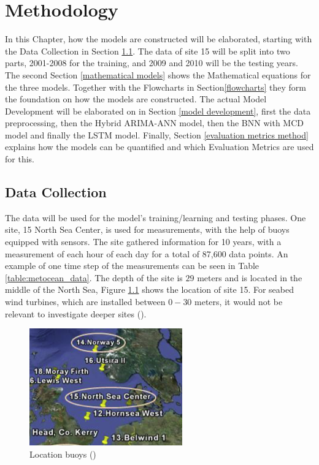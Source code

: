 \chapter{Methodology}
In this Chapter, how the models are constructed will be elaborated, starting with the Data Collection in Section \ref{data_collection}. The data of site 15 will be split into two parts, 2001-2008 for the training, and 2009 and 2010 will be the testing years. The second Section \ref{mathematical models} shows the Mathematical equations for the three models. Together with the Flowcharts in Section\ref{flowcharts} they form the foundation on how the models are constructed. The actual Model Development will be elaborated on in Section \ref{model development}, first the data preprocessing, then the Hybrid ARIMA-ANN model, then the BNN with MCD model and finally the LSTM model. Finally, Section \ref{evaluation metrics method} explains how the models can be quantified and which Evaluation Metrics are used for this. 

\section{Data Collection}
\label{data_collection}
The data will be used for the model's training/learning and testing phases. One site, 15 North Sea Center, is used for measurements, with the help of buoys equipped with sensors. The site gathered information for 10 years, with a measurement of each hour of each day for a total of 87,600 data points. An example of one time step of the measurements can be seen in Table \ref{table:metocean_data}. The depth of the site is $29$ meters and is located in the middle of the North Sea, Figure \ref{fig:location buoys} shows the location of site 15. For seabed wind turbines, which are installed between $0-30$ meters, it would not be relevant to investigate deeper sites (\cite{DNV2018}).

\begin{figure}[ht!]
    \centering
    \includegraphics[width=0.4\linewidth]{images/Location buoys.png}
    \caption{Location buoys (\cite{lin2015joint})}
    \label{fig:location buoys}
\end{figure}


